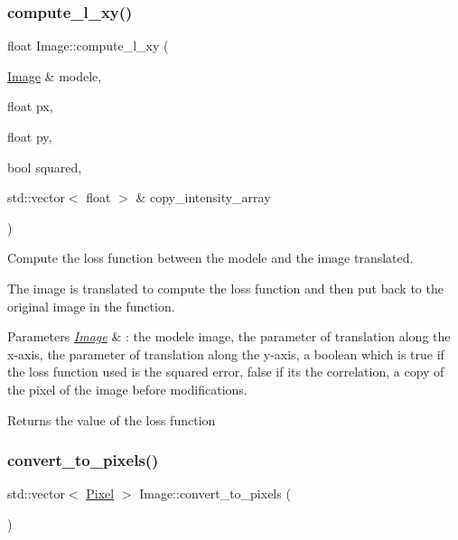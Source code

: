 \subsubsection{\texorpdfstring{compute\+\_\+l\+\_\+xy()}{compute\_l\_xy()}}
{\footnotesize\ttfamily float Image\+::compute\+\_\+l\+\_\+xy (\begin{DoxyParamCaption}\item[{\hyperlink{class_image}{Image} \&}]{modele,  }\item[{float}]{px,  }\item[{float}]{py,  }\item[{bool}]{squared,  }\item[{std\+::vector$<$ float $>$ \&}]{copy\+\_\+intensity\+\_\+array }\end{DoxyParamCaption})}



Compute the loss function between the modele and the image translated. 

The image is translated to compute the loss function and then put back to the original image in the function.


\begin{DoxyParams}{Parameters}
{\em \hyperlink{class_image}{Image}} & \+: the modele image, the parameter of translation along the x-\/axis, the parameter of translation along the y-\/axis, a boolean which is true if the loss function used is the squared error, false if it\textquotesingle{}s the correlation, a copy of the pixel of the image before modifications. \\
\hline
\end{DoxyParams}
\begin{DoxyReturn}{Returns}
the value of the loss function 
\end{DoxyReturn}
\mbox{\label{class_image_a04c8cb611e932e8b211fe9ca4473fe8c}} 
\subsubsection{\texorpdfstring{convert\+\_\+to\+\_\+pixels()}{convert\_to\_pixels()}}
{\footnotesize\ttfamily std\+::vector$<$ \hyperlink{class_pixel}{Pixel} $>$ Image\+::convert\+\_\+to\+\_\+pixels (\begin{DoxyParamCaption}{ }\end{DoxyParamCaption})}

